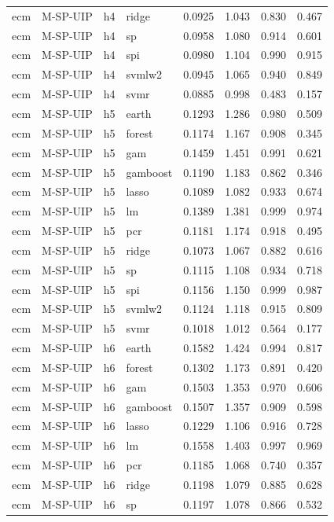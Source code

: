 \begin{ThreePartTable}
\begin{longtable}[t]{llclcccc}
ecm & M-SP-UIP & h4 & ridge & 0.0925 & 1.043 & 0.830 & 0.467\\
ecm & M-SP-UIP & h4 & sp & 0.0958 & 1.080 & 0.914 & 0.601\\
ecm & M-SP-UIP & h4 & spi & 0.0980 & 1.104 & 0.990 & 0.915\\
ecm & M-SP-UIP & h4 & svmlw2 & 0.0945 & 1.065 & 0.940 & 0.849\\
ecm & M-SP-UIP & h4 & svmr & 0.0885 & 0.998 & 0.483 & 0.157\\
\addlinespace
ecm & M-SP-UIP & h5 & earth & 0.1293 & 1.286 & 0.980 & 0.509\\
ecm & M-SP-UIP & h5 & forest & 0.1174 & 1.167 & 0.908 & 0.345\\
ecm & M-SP-UIP & h5 & gam & 0.1459 & 1.451 & 0.991 & 0.621\\
ecm & M-SP-UIP & h5 & gamboost & 0.1190 & 1.183 & 0.862 & 0.346\\
ecm & M-SP-UIP & h5 & lasso & 0.1089 & 1.082 & 0.933 & 0.674\\
ecm & M-SP-UIP & h5 & lm & 0.1389 & 1.381 & 0.999 & 0.974\\
ecm & M-SP-UIP & h5 & pcr & 0.1181 & 1.174 & 0.918 & 0.495\\
ecm & M-SP-UIP & h5 & ridge & 0.1073 & 1.067 & 0.882 & 0.616\\
ecm & M-SP-UIP & h5 & sp & 0.1115 & 1.108 & 0.934 & 0.718\\
ecm & M-SP-UIP & h5 & spi & 0.1156 & 1.150 & 0.999 & 0.987\\
ecm & M-SP-UIP & h5 & svmlw2 & 0.1124 & 1.118 & 0.915 & 0.809\\
ecm & M-SP-UIP & h5 & svmr & 0.1018 & 1.012 & 0.564 & 0.177\\
\addlinespace
ecm & M-SP-UIP & h6 & earth & 0.1582 & 1.424 & 0.994 & 0.817\\
ecm & M-SP-UIP & h6 & forest & 0.1302 & 1.173 & 0.891 & 0.420\\
ecm & M-SP-UIP & h6 & gam & 0.1503 & 1.353 & 0.970 & 0.606\\
ecm & M-SP-UIP & h6 & gamboost & 0.1507 & 1.357 & 0.909 & 0.598\\
ecm & M-SP-UIP & h6 & lasso & 0.1229 & 1.106 & 0.916 & 0.728\\
ecm & M-SP-UIP & h6 & lm & 0.1558 & 1.403 & 0.997 & 0.969\\
ecm & M-SP-UIP & h6 & pcr & 0.1185 & 1.068 & 0.740 & 0.357\\
ecm & M-SP-UIP & h6 & ridge & 0.1198 & 1.079 & 0.885 & 0.628\\
ecm & M-SP-UIP & h6 & sp & 0.1197 & 1.078 & 0.866 & 0.532\\

\end{longtable}
\end{ThreePartTable}
